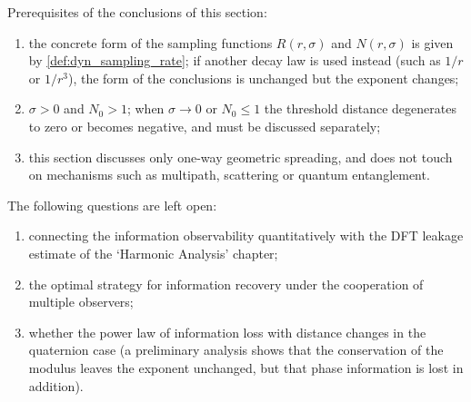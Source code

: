 \begin{remark}\label{rem:dyn_information_distance_scope}
Prerequisites of the conclusions of this section:
\begin{enumerate}[label=(\roman*)]
    \item the concrete form of the sampling functions $R(r,\sigma)$ and $N(r,\sigma)$ is given by \cref{def:dyn_sampling_rate}; if another decay law is used instead (such as $1/r$ or $1/r^3$), the form of the conclusions is unchanged but the exponent changes;
    \item $\sigma>0$ and $N_0>1$; when $\sigma\to 0$ or $N_0\le 1$ the threshold distance degenerates to zero or becomes negative, and must be discussed separately;
    \item this section discusses only one-way geometric spreading, and does not touch on mechanisms such as multipath, scattering or quantum entanglement.
\end{enumerate}
The following questions are left open:
\begin{enumerate}[label=(\alph*)]
    \item connecting the information observability quantitatively with the DFT leakage estimate of the `Harmonic Analysis' chapter;
    \item the optimal strategy for information recovery under the cooperation of multiple observers;
    \item whether the power law of information loss with distance changes in the quaternion case (a preliminary analysis shows that the conservation of the modulus leaves the exponent unchanged, but that phase information is lost in addition).
\end{enumerate}
\end{remark}


